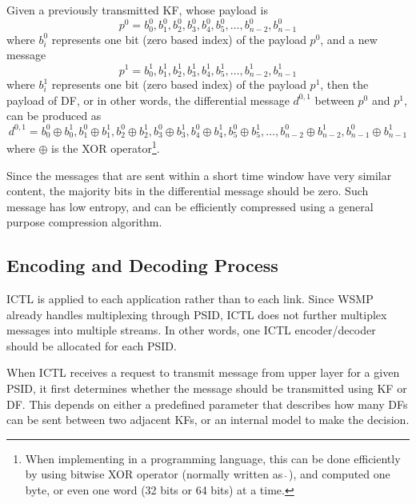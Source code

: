 \documentclass[12pt]{report}
\begin{document}
Given a previously transmitted KF, whose payload is
\begin{equation}
  p^0={b^0_0,b^0_1,b^0_2,b^0_3,b^0_4,b^0_5,\ldots,b^0_{n-2},b^0_{n-1}}
\end{equation}
where $b^0_i$ represents one bit (zero based index) of the payload $p^0$, and a new message
\begin{equation}
  p^1={b^1_0,b^1_1,b^1_2,b^1_3,b^1_4,b^1_5,\ldots,b^1_{n-2},b^1_{n-1}}
\end{equation}
where $b^1_i$ represents one bit (zero based index) of the payload $p^1$, then the payload of DF, or in other words, the differential message $d^{0,1}$ between $p^0$ and $p^1$, can be produced as
\begin{equation}
  d^{0,1}={b^0_0\oplus b^1_0,b^0_1\oplus b^1_1,b^0_2\oplus b^1_2,b^0_3\oplus b^1_3,b^0_4\oplus b^1_4,b^0_5\oplus b^1_5,\ldots,b^0_{n-2}\oplus b^1_{n-2},b^0_{n-1}\oplus b^1_{n-1}}
\end{equation}
where $\oplus $ is the XOR operator\footnote{When implementing in a programming language, this can be done efficiently by using bitwise XOR operator (normally written as $\hat{\ }$), and computed one byte, or even one word (32 bits or 64 bits) at a time.}.

Since the messages that are sent within a short time window have very similar content, the majority bits in the differential message should be zero. Such message has low entropy, and can be efficiently compressed using a general purpose compression algorithm.

\subsection{Encoding and Decoding Process}
\label{sec:ictl_process}

ICTL is applied to each application rather than to each link. Since WSMP already handles multiplexing through PSID, ICTL does not further multiplex messages into multiple streams. In other words, one ICTL encoder/decoder should be allocated for each PSID.

When ICTL receives a request to transmit message from upper layer for a given PSID, it first determines whether the message should be transmitted using KF or DF. This depends on either a predefined parameter that describes how many DFs can be sent between two adjacent KFs, or an internal model to make the decision.
\end{document}
